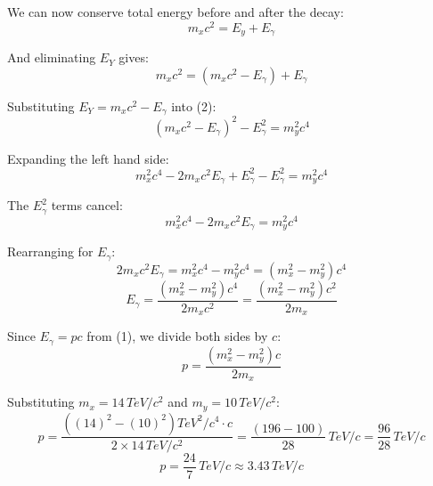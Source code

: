 We can now conserve total energy before and after the decay:
\[
    m_x c^2 = E_y + E_\gamma
\]

And eliminating $E_Y$ gives:
\[
    m_xc^2 = (m_xc^2 - E_\gamma) + E_\gamma
\]

Substituting $E_Y = m_xc^2 - E_\gamma$ into (2):
\[
    (m_xc^2 - E_\gamma)^2 - E_\gamma^2 = m_y^2c^4
\]

Expanding the left hand side:
\[
    m_x^2c^4 - 2m_xc^2E_\gamma + E_\gamma^2 - E_\gamma^2 = m_y^2c^4
\]

The $E_\gamma^2$ terms cancel:
\[
    m_x^2c^4 - 2m_xc^2E_\gamma = m_y^2c^4
\]

Rearranging for $E_\gamma$:
\[
    2m_xc^2E_\gamma = m_x^2c^4 - m_y^2c^4 = (m_x^2 - m_y^2)c^4
\]
\[
    E_\gamma = \frac{(m_x^2 - m_y^2)c^4}{2m_xc^2} = \frac{(m_x^2 - m_y^2)c^2}{2m_x}
\]

Since $E_\gamma = pc$ from (1), we divide both sides by $c$:
\[
    \boxed{p = \frac{(m_x^2 - m_y^2)c}{2m_x}}
\]

Substituting $m_x = 14\,\si{TeV/c^2}$ and $m_y = 10\,\si{TeV/c^2}$:
\[
    p = \frac{\left((14)^2 - (10)^2\right)\si{TeV}^2/c^4 \cdot c}{2 \times 14\,\si{TeV}/c^2} = \frac{(196 - 100)}{28}\,\si{TeV}/c = \frac{96}{28}\,\si{TeV}/c
\]
\[
    p = \frac{24}{7}\,\si{TeV}/c \approx 3.43\,\si{TeV}/c
\]
